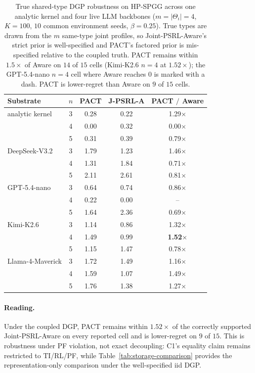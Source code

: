 \begin{table}[h]
\centering\small
\caption{True shared-type DGP robustness on HP-SPGG across one analytic kernel and four live LLM backbones ($m{=}|\Theta_i|{=}4$, $K{=}100$, $10$ common environment seeds, $\beta{=}0.25$). True types are drawn from the $m$ same-type joint profiles, so Joint-PSRL-Aware's strict prior is well-specified and PACT's factored prior is mis-specified relative to the coupled truth. PACT remains within $1.5\times$ of Aware on $14$ of $15$ cells (Kimi-K2.6 $n{=}4$ at $1.52\times$); the GPT-5.4-nano $n{=}4$ cell where Aware reaches $0$ is marked with a dash. PACT is lower-regret than Aware on $9$ of $15$ cells.}
\label{tab:true-shared-dgp}
\setlength{\tabcolsep}{8pt}
\begin{tabular}{@{}lcccc@{}}
\toprule
Substrate & $n$ & PACT & J-PSRL-A & PACT $/$ Aware \\
\midrule
analytic kernel       & 3 & 0.28 & 0.22 & 1.29$\times$ \\
                      & 4 & 0.00 & 0.32 & 0.00$\times$ \\
                      & 5 & 0.31 & 0.39 & 0.79$\times$ \\
\midrule
DeepSeek-V3.2         & 3 & 1.79 & 1.23 & 1.46$\times$ \\
                      & 4 & 1.31 & 1.84 & 0.71$\times$ \\
                      & 5 & 2.11 & 2.61 & 0.81$\times$ \\
\midrule
GPT-5.4-nano          & 3 & 0.64 & 0.74 & 0.86$\times$ \\
                      & 4 & 0.22 & 0.00 & --           \\
                      & 5 & 1.64 & 2.36 & 0.69$\times$ \\
\midrule
Kimi-K2.6             & 3 & 1.14 & 0.86 & 1.32$\times$ \\
                      & 4 & 1.49 & 0.99 & \textbf{1.52$\times$} \\
                      & 5 & 1.15 & 1.47 & 0.78$\times$ \\
\midrule
Llama-4-Maverick      & 3 & 1.72 & 1.49 & 1.16$\times$ \\
                      & 4 & 1.59 & 1.07 & 1.49$\times$ \\
                      & 5 & 1.76 & 1.38 & 1.27$\times$ \\
\bottomrule
\end{tabular}
\end{table}

\paragraph{Reading.} Under the coupled DGP, PACT remains within $1.52\times$ of the correctly supported Joint-PSRL-Aware on every reported cell and is lower-regret on $9$ of $15$. This is robustness under PF violation, not exact decoupling: C1's equality claim remains restricted to TI/RL/PF, while Table~\ref{tab:storage-comparison} provides the representation-only comparison under the well-specified iid DGP.

